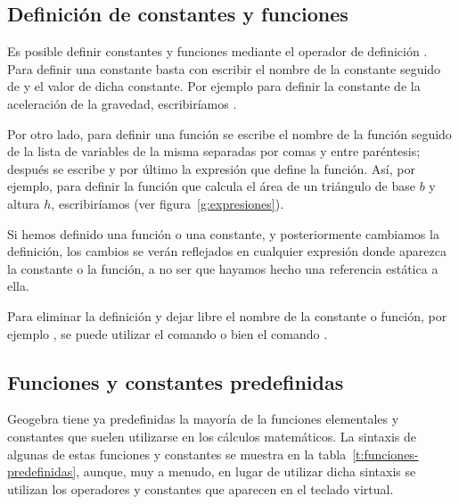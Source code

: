 \subsection*{Definición de constantes y funciones}
Es posible definir constantes y funciones mediante el operador de definición \command{:=}.
Para definir una constante basta con escribir el nombre de la constante seguido de \command{:=} y el valor de dicha constante.
Por ejemplo para definir la constante de la aceleración de la gravedad, escribiríamos .

Por otro lado, para definir una función se escribe el nombre de la función seguido de la lista de variables de la misma separadas por comas y entre paréntesis; después se escribe \command{:=} y por último la expresión que define la función.
Así, por ejemplo, para definir la función que calcula el área de un triángulo de base $b$ y altura $h$, escribiríamos  (ver figura~\ref{g:expresiones}).

Si hemos definido una función o una constante, y posteriormente cambiamos la definición, los cambios se verán reflejados en cualquier expresión donde aparezca la constante o la función, a no ser que hayamos hecho una referencia estática a ella.

Para eliminar la definición y dejar libre el nombre de la constante o función, por ejemplo , se puede utilizar el comando  o bien el comando .

\subsection*{Funciones y constantes predefinidas}
Geogebra tiene ya predefinidas la mayoría de la funciones elementales y constantes que suelen utilizarse en los cálculos matemáticos.
La sintaxis de algunas de estas funciones y constantes se muestra en la tabla~\ref{t:funciones-predefinidas}, aunque, muy a menudo, en lugar de utilizar dicha sintaxis se utilizan los operadores y constantes que aparecen en el teclado virtual.

